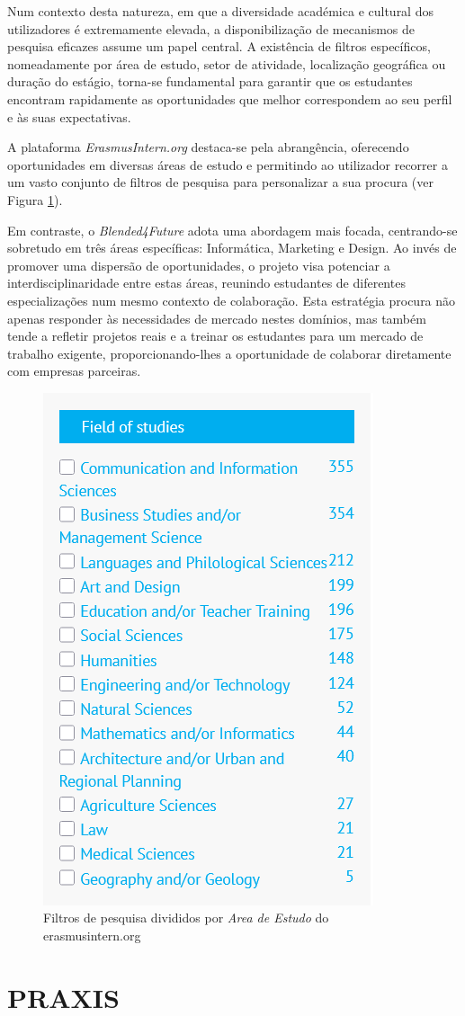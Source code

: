 Num contexto desta natureza, em que a diversidade académica e cultural dos utilizadores é extremamente elevada, a disponibilização de mecanismos de pesquisa eficazes assume um papel central. A existência de filtros específicos, nomeadamente por área de estudo, setor de atividade, localização geográfica ou duração do estágio, torna-se fundamental para garantir que os estudantes encontram rapidamente as oportunidades que melhor correspondem ao seu perfil e às suas expectativas.

A plataforma \textit{ErasmusIntern.org} destaca-se pela abrangência, oferecendo oportunidades em diversas áreas de estudo e permitindo ao utilizador recorrer a um vasto conjunto de filtros de pesquisa para personalizar a sua procura (ver Figura \ref{fig:erasmus-intern-filters}).

Em contraste, o \textit{Blended4Future} adota uma abordagem mais focada, centrando-se sobretudo em três áreas específicas: Informática, Marketing e Design. Ao invés de promover uma dispersão de oportunidades, o projeto visa potenciar a interdisciplinaridade entre estas áreas, reunindo estudantes de diferentes especializações num mesmo contexto de colaboração. Esta estratégia procura não apenas responder às necessidades de mercado nestes domínios, mas também tende a refletir projetos reais e a treinar os estudantes para um mercado de trabalho exigente, proporcionando-lhes a oportunidade de colaborar diretamente com empresas parceiras.

\begin{figure}[h!tbp]
    \centering
    \includegraphics[width=0.3\linewidth]{capitulos/cap2-estadodaarte/assets/image/esn/erasmus-intern filters.png}
    \caption{Filtros de pesquisa divididos por \textit{Area de Estudo} do erasmusintern.org}
    \label{fig:erasmus-intern-filters}
\end{figure}

\section{PRAXIS}


